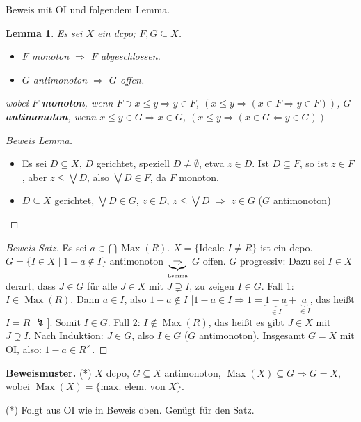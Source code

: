 \documentclass[headsepline=true,DIV=11]{scrartcl}
\newtheorem*{lemma}{Lemma}
\theoremstyle{definition}
\newcommand{\Max}{\operatorname{Max}}
\begin{document}
Beweis mit OI und folgendem Lemma.

\begin{lemma}
  Es sei $X$ ein dcpo; $F,G\subseteq X$.
  \begin{itemize}
    \item[a.] $F$ monoton $\Rightarrow$ $F$ abgeschlossen.
    \item[b.] $G$ antimonoton $\Rightarrow$ $G$ offen.
  \end{itemize}
  wobei $F$ {\bf monoton}, wenn $F\ni x\le y\Rightarrow y\in F$, $(x\le y \Rightarrow (x\in F\Rightarrow y\in F))$, $G$ {\bf antimonoton}, wenn $x\le
  y\in G\Rightarrow x\in G$, $(x\le y\Rightarrow (x\in G\Leftarrow y\in G))$
\end{lemma}

\begin{proof}[Beweis Lemma]
  $\phantom{a}$
  \begin{itemize}
    \item[a.] Es sei $D\subseteq X$, $D$ gerichtet, speziell $D\neq\emptyset$, etwa $z\in D$. Ist $D\subseteq F$, so ist $z\in F$, aber $z\le\bigvee
      D$, also $\bigvee D\in F$, da $F$ monoton.
    \item[b.] $D\subseteq X$ gerichtet, $\bigvee D\in G$, $z\in D$, $z\le\bigvee D$ $\Rightarrow$ $z\in G$ ($G$ antimonoton)
  \end{itemize}
\end{proof}

\begin{proof}[Beweis Satz]
  Es sei $a\in\bigcap\Max(R)$. $X=\{\mbox{Ideale }I\neq R\}$ ist ein dcpo. $G=\{I\in X\mid 1-a\not\in I\}$ antimonoton
  $\underbrace{\Rightarrow}_{\mbox{\tiny Lemma}}$ $G$ offen. $G$ progressiv: Dazu sei $I\in X$ derart, dass $J\in G$ für alle $J\in X$ mit
  $J\supsetneq I$, zu zeigen $I\in G$. Fall 1: $I\in\Max(R)$. Dann $a\in I$, also $1-a\not\in I$ [$1-a\in I\Rightarrow 1=\underbrace{1-a}_{\in
      I}+\underbrace{a}_{\in I}$, das heißt $I=R$ $\lightning$]. Somit $I\in G$. Fall 2: $I\not\in\Max(R)$, das heißt es gibt $J\in X$ mit
  $J\supsetneq I$. Nach Induktion: $J\in G$, also $I\in G$ ($G$ antimonoton). Insgesamt $G=X$ mit OI, also: $1-a\in R^\times$.
\end{proof}

{\bf Beweismuster.} (*) $X$ dcpo, $G\subseteq X$ antimonoton, $\Max(X)\subseteq G\Rightarrow G=X$, wobei $\Max(X)=\{\mbox{max. elem. von }X\}$.

(*) Folgt aus OI wie in Beweis oben. Genügt für den Satz.
\end{document}
